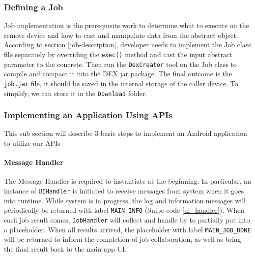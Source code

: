 \documentclass[conference]{IEEEtran}
\begin{document}
\subsubsection{Defining a Job}

Job implementation is the prerequisite work to determine what to execute on the remote device and how to cast and manipulate data from the abstract object. According to section \ref{job-description}, developer needs to implement the Job class file separately by overriding the \texttt{exec()} method and cast the input abstract parameter to the concrete. Then run the \texttt{DexCreator} tool on the Job class to compile and compact it into the DEX jar package. The final outcome is the \texttt{job.jar} file, it should be saved in the internal storage of the caller device. To simplify, we can store it in the \texttt{Download} folder.  

\subsubsection{Implementing an Application Using APIs}

This sub section will describe 3 basic steps to implement an Android application to utilize our APIs

\paragraph{Message Handler}

The Message Handler is required to instantiate at the beginning. In particular, an instance of \texttt{UIHandler} is initiated to receive messages from system when it goes into runtime. While system is in progress, the log and information messages will periodically be returned with label \texttt{MAIN\_INFO} (Snipe code \ref{ui_handler}). When each job result comes, \texttt{JobHandler} will collect and handle by  to partially put into a placeholder. When all results arrived, the placeholder with label \texttt{MAIN\_JOB\_DONE} will be returned to inform the completion of job collaboration, as well as bring the final result back to the main app UI.\\

\noindent {}
\end{document}
